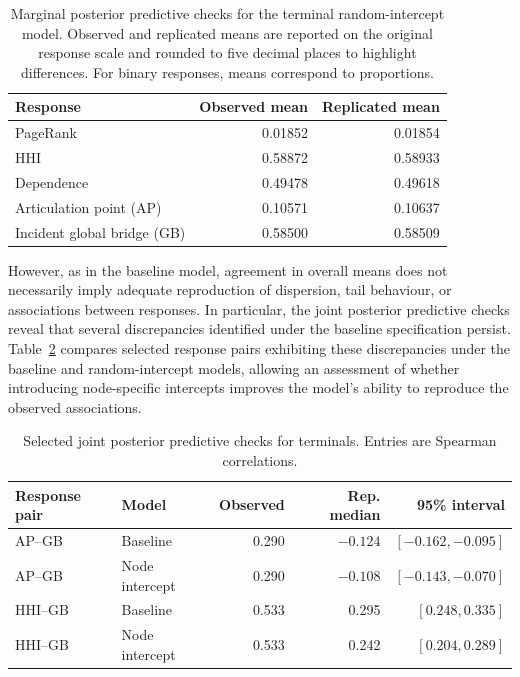 \documentclass[pdftex,12pt,openright,a4paper,oneside]{book}
\begin{document}
\begin{table}[htbp]
\centering
\caption{Marginal posterior predictive checks for the terminal random-intercept model. 
Observed and replicated means are reported on the original response scale and rounded to five decimal places to highlight differences. 
For binary responses, means correspond to proportions.}
\label{tab:node_terminal_marginal_ppc}
\small
\begin{tabular}{lrr}
\hline
Response & Observed mean & Replicated mean \\
\hline
PageRank & 0.01852 & 0.01854 \\
HHI & 0.58872 & 0.58933 \\
Dependence & 0.49478 & 0.49618 \\
Articulation point (AP) & 0.10571 & 0.10637 \\
Incident global bridge (GB) & 0.58500 & 0.58509 \\
\hline
\end{tabular}
\end{table}

However, as in the baseline model, agreement in overall means does not necessarily imply adequate reproduction of dispersion, 
tail behaviour, or associations between responses.
In particular, the joint posterior predictive checks reveal that several discrepancies identified under the baseline specification persist.
Table~\ref{tab:joint_ppc_node_intercepts} compares selected response pairs exhibiting these discrepancies under the baseline and random-intercept models, allowing an 
assessment of whether introducing node-specific intercepts improves the model's ability to reproduce the observed associations.

\begin{table}[htbp]
\centering
\small
\caption{Selected joint posterior predictive
checks for terminals. Entries are Spearman
correlations.}
\label{tab:joint_ppc_node_intercepts}
\begin{tabular}{llrrr}
\hline
Response pair & Model & Observed
& Rep. median & 95\% interval \\
\hline
AP--GB & Baseline
& 0.290 & $-0.124$ & $[-0.162,-0.095]$ \\
AP--GB & Node intercept
& 0.290 & $-0.108$ & $[-0.143,-0.070]$ \\
HHI--GB & Baseline
& 0.533 & 0.295 & $[0.248,0.335]$ \\
HHI--GB & Node intercept
& 0.533 & 0.242 & $[0.204,0.289]$ \\
\hline
\end{tabular}
\end{table}
\end{document}
